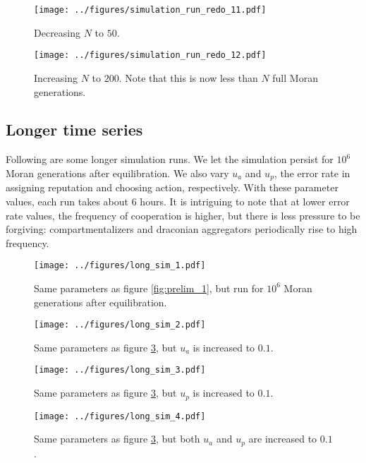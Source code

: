 \documentclass[13pt]{amsart}
\begin{document}
\begin{figure}
    \texttt{[image: ../figures/simulation\_run\_redo\_11.pdf]}
    \caption{Decreasing $N$ to $50$.}
    \label{fig:prelim_11}
\end{figure}

\begin{figure}
    \texttt{[image: ../figures/simulation\_run\_redo\_12.pdf]}
    \caption{Increasing $N$ to $200$.
    Note that this is now less than $N$ full Moran generations.}
    \label{fig:prelim_12}
\end{figure}

\clearpage

\subsection*{Longer time series}

Following are some longer simulation runs.
We let the simulation persist for $10^6$ Moran generations after equilibration.
We also vary $u_a$ and $u_p$, the error rate in assigning reputation and choosing action, respectively.
With these parameter values, each run takes about $6$ hours.
It is intriguing to note that at lower error rate values, the frequency of cooperation is higher, but there is less pressure to be forgiving: compartmentalizers and draconian aggregators periodically rise to high frequency.

\clearpage

\begin{figure}
    \texttt{[image: ../figures/long\_sim\_1.pdf]}
    \caption{Same parameters as figure \ref{fig:prelim_1}, but run for $10^6$ Moran generations after equilibration.}
    \label{fig:long_sim_1}
\end{figure}

\begin{figure}
    \texttt{[image: ../figures/long\_sim\_2.pdf]}
    \caption{Same parameters as figure \ref{fig:long_sim_1}, but $u_a$ is increased to $0.1$.}
\end{figure}

\begin{figure}
    \texttt{[image: ../figures/long\_sim\_3.pdf]}
    \caption{Same parameters as figure \ref{fig:long_sim_1}, but $u_p$ is increased to $0.1$.}
\end{figure}

\begin{figure}
    \texttt{[image: ../figures/long\_sim\_4.pdf]}
    \caption{Same parameters as figure \ref{fig:long_sim_1}, but both $u_a$ and $u_p$ are increased to $0.1$.}
\end{figure}
\end{document}
